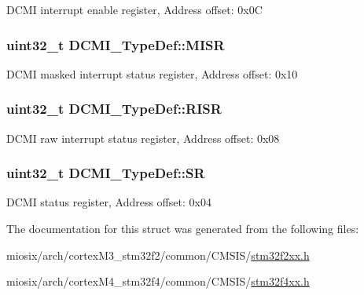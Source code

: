 D\-C\-M\-I interrupt enable register, Address offset\-: 0x0\-C \hypertarget{struct_d_c_m_i___type_def_ab367c4ca2e8ac87238692e6d55d622ec}{
\subsubsection[{M\-I\-S\-R}]{ uint32\-\_\-t D\-C\-M\-I\-\_\-\-Type\-Def\-::\-M\-I\-S\-R}}\label{struct_d_c_m_i___type_def_ab367c4ca2e8ac87238692e6d55d622ec}
D\-C\-M\-I masked interrupt status register, Address offset\-: 0x10 \hypertarget{struct_d_c_m_i___type_def_ae0aba9f38498cccbe0186b7813825026}{
\subsubsection[{R\-I\-S\-R}]{ uint32\-\_\-t D\-C\-M\-I\-\_\-\-Type\-Def\-::\-R\-I\-S\-R}}\label{struct_d_c_m_i___type_def_ae0aba9f38498cccbe0186b7813825026}
D\-C\-M\-I raw interrupt status register, Address offset\-: 0x08 \hypertarget{struct_d_c_m_i___type_def_a1bbe4b3cc5d9552526bec462b42164d5}{
\subsubsection[{S\-R}]{ uint32\-\_\-t D\-C\-M\-I\-\_\-\-Type\-Def\-::\-S\-R}}\label{struct_d_c_m_i___type_def_a1bbe4b3cc5d9552526bec462b42164d5}
D\-C\-M\-I status register, Address offset\-: 0x04 

The documentation for this struct was generated from the following files\-:\begin{DoxyCompactItemize}
\item 
miosix/arch/cortex\-M3\-\_\-stm32f2/common/\-C\-M\-S\-I\-S/\hyperlink{stm32f2xx_8h}{stm32f2xx.\-h}\item 
miosix/arch/cortex\-M4\-\_\-stm32f4/common/\-C\-M\-S\-I\-S/\hyperlink{stm32f4xx_8h}{stm32f4xx.\-h}\end{DoxyCompactItemize}
